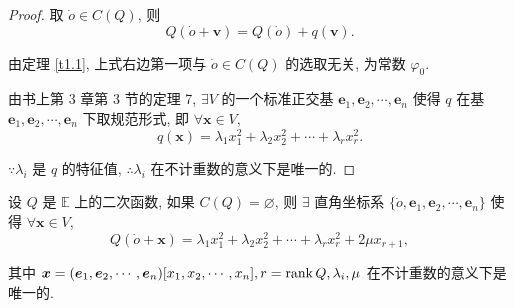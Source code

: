 \documentclass[color=black,device=normal,lang=cn,mode=geye]{elegantnote}
\begin{document}
\begin{proof}
    取 $\dot{o}\in C(Q)$, 则
    \[Q(\dot{o}+\boldsymbol{v})=Q(\dot{o})+q(\boldsymbol{v}).\]

    由定理 \ref{t1.1}, 上式右边第一项与 $\dot{o}\in C(Q)$ 的选取无关, 为常数 $\varphi_0$.

    由书上第 3 章第 3 节的定理 7, $\exists V$ 的一个标准正交基 $\boldsymbol{e}_1,\boldsymbol{e}_2,\cdots,\boldsymbol{e}_n$ 使得 $q$ 在基 $\boldsymbol{e}_1,\boldsymbol{e}_2,\cdots,\boldsymbol{e}_n$ 下取规范形式, 即 $\forall\boldsymbol{x}\in V$,
    \[q(\boldsymbol{x})=\lambda_1x^2_1+\lambda_2x^2_2+\cdots+\lambda_rx^2_r.\]

    $\because\lambda_i$ 是 $q$ 的特征值, $\therefore\lambda_i$ 在不计重数的意义下是唯一的.
\end{proof}
\begin{theorem}
    设 $Q$ 是 $\mathbb{E}$ 上的二次函数, 如果 $C(Q)=\varnothing$, 则 $\exists$ 直角坐标系 $\{\dot{o},\boldsymbol{e}_1,\boldsymbol{e}_2,\cdots,\boldsymbol{e}_n\}$ 使得 $\forall\boldsymbol{x}\in V$,
    \[Q(\dot{o}+\boldsymbol{x})=\lambda_1x^2_1+\lambda_2x^2_2+\cdots+\lambda_rx^2_r+2\mu x_{r+1},\]

    其中 $\boldsymbol{x}=(\boldsymbol{e}_1,\boldsymbol{e}_2,\cdots,\boldsymbol{e}_n)[x_1,x_2,\cdots,x_n],r=\operatorname{rank} Q,\lambda_i,\mu$ 在不计重数的意义下是唯一的.
\end{theorem}
\end{document}

